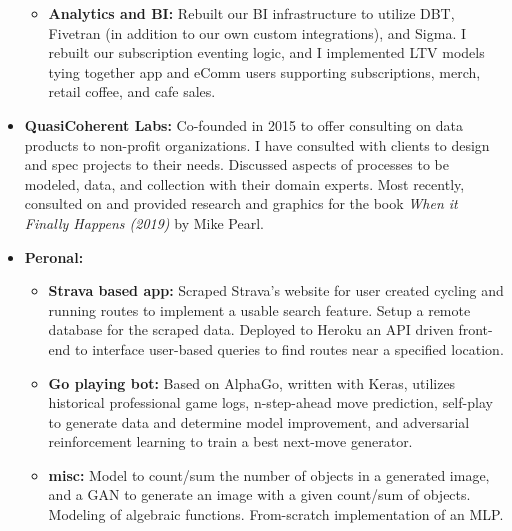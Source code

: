 \documentclass[a4paper,10pt,notitlepage]{article}
\begin{document}
\begin{itemize}
\begin{itemize}
                    \item \textbf{Analytics and BI:} Rebuilt our BI infrastructure to utilize DBT, Fivetran (in addition to our own custom integrations), and Sigma. I rebuilt our subscription eventing logic, and I implemented LTV models tying together app and eComm users supporting subscriptions, merch, retail coffee, and cafe sales.
            \end{itemize}
        \vspace{-5pt}\item \textbf{QuasiCoherent Labs:} Co-founded in 2015 to offer consulting on data products to non-profit organizations. I have consulted with clients to design and spec projects to their needs. Discussed aspects of processes to be modeled, data, and collection with their domain experts. Most recently, consulted on and provided research and graphics for the book \emph{When it Finally Happens (2019)} by Mike Pearl.
        \vspace{-5pt}\item \textbf{Peronal:} 
            \begin{itemize}
                \item \textbf{Strava based app:} Scraped Strava's website for user created cycling and running routes to implement a usable search feature. Setup a remote database for the scraped data. Deployed to Heroku an API driven front-end to interface user-based queries to find routes near a specified location.
                \item \textbf{Go playing bot:} Based on AlphaGo, written with Keras, utilizes historical professional game logs, n-step-ahead move prediction, self-play to generate data and determine model improvement, and adversarial reinforcement learning to train a best next-move generator.
                \item \textbf{misc:} Model to count/sum the number of objects in a generated image, and a GAN to generate an image with a given count/sum of objects. Modeling of algebraic functions. From-scratch implementation of an MLP.
            \end{itemize}
    \end{itemize}
\end{document}
